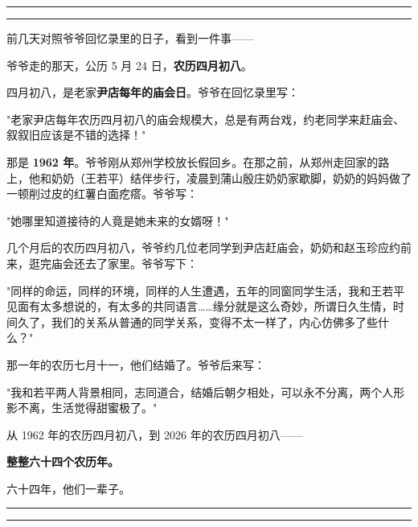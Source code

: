 \documentclass[11pt]{ctexart}
\newenvironment{quoteblk}{%
  \vspace{0.4em}%
  \begin{list}{}{%
    \setlength{\leftmargin}{1.2em}%
    \setlength{\rightmargin}{0.4em}%
    \setlength{\topsep}{0pt}%
    \setlength{\parsep}{0pt}%
  }\item[]{\trueka\color{inkgray}\small}%
}{%
  \end{list}\vspace{0.4em}%
}
\begin{document}
\begin{center}
{\color{seal}\rule{2em}{0.5pt}}\hspace{0.5em}%
\raisebox{-1pt}{\color{seal}$\blacklozenge$}\hspace{0.5em}%
{\color{seal}\rule{2em}{0.5pt}}
\end{center}

\vspace{0.6em}

前几天对照爷爷回忆录里的日子，看到一件事——

爷爷走的那天，公历 5 月 24 日，{\bfseries 农历四月初八}。

四月初八，是老家\textbf{尹店每年的庙会日}。爷爷在回忆录里写：

\begin{quoteblk}
"老家尹店每年农历四月初八的庙会规模大，总是有两台戏，约老同学来赶庙会、叙叙旧应该是不错的选择！"
\end{quoteblk}

那是 \textbf{1962 年}。爷爷刚从郑州学校放长假回乡。在那之前，从郑州走回家的路上，他和奶奶（王若平）结伴步行，凌晨到蒲山殷庄奶奶家歇脚，奶奶的妈妈做了一顿削过皮的红薯白面疙瘩。爷爷写：

\begin{quoteblk}
"她哪里知道接待的人竟是她未来的女婿呀！"
\end{quoteblk}

几个月后的农历四月初八，爷爷约几位老同学到尹店赶庙会，奶奶和赵玉珍应约前来，逛完庙会还去了家里。爷爷写下：

\begin{quoteblk}
"同样的命运，同样的环境，同样的人生遭遇，五年的同窗同学生活，我和王若平见面有太多想说的，有太多的共同语言……缘分就是这么奇妙，所谓日久生情，时间久了，我们的关系从普通的同学关系，变得不太一样了，内心仿佛多了些什么？"
\end{quoteblk}

那一年的农历七月十一，他们结婚了。爷爷后来写：

\begin{quoteblk}
"我和若平两人背景相同，志同道合，结婚后朝夕相处，可以永不分离，两个人形影不离，生活觉得甜蜜极了。"
\end{quoteblk}

从 1962 年的农历四月初八，到 2026 年的农历四月初八——

\begin{center}
{\bfseries\large 整整六十四个农历年。}
\end{center}

\vspace{0.4em}
\begin{center}
六十四年，他们一辈子。
\end{center}

\vfill

\begin{center}
{\color{seal}\rule{2em}{0.5pt}}\hspace{0.5em}%
\raisebox{-1pt}{\color{seal}$\blacklozenge$}\hspace{0.5em}%
{\color{seal}\rule{2em}{0.5pt}}
\end{center}
\end{document}
